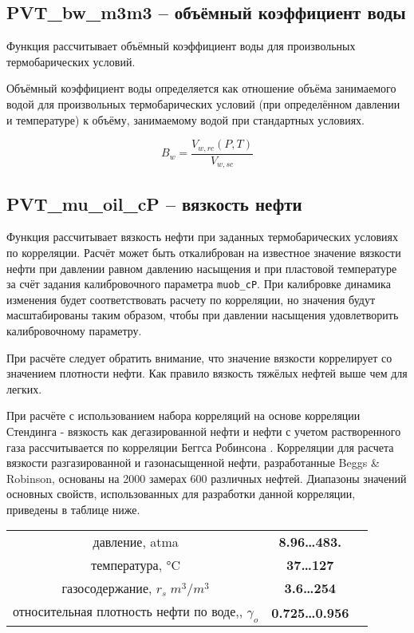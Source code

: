 \subsection{PVT\_bw\_m3m3 – объёмный коэффициент воды}
Функция рассчитывает объёмный коэффициент воды для произвольных термобарических условий. 

Объёмный коэффициент воды определяется как отношение объёма занимаемого водой для произвольных термобарических условий (при определённом давлении и температуре) к объёму, занимаемому водой при стандартных условиях. 

$$B_w = \frac{V_{w,rc}(P,T)}{V_{w,sc}}$$


\subsection{PVT\_mu\_oil\_cP – вязкость нефти}
Функция рассчитывает вязкость нефти при заданных термобарических условиях по корреляции. Расчёт может быть откалиброван на известное значение вязкости нефти при давлении равном давлению насыщения и при пластовой температуре за счёт задания калибровочного параметра \texttt{muob_cP}. При калибровке динамика изменения будет соответствовать расчету по корреляции, но значения будут масштабированы таким образом, чтобы при давлении насыщения удовлетворить калибровочному параметру.

При расчёте следует обратить внимание, что значение вязкости коррелирует со значением плотности нефти. Как правило вязкость тяжёлых нефтей выше чем для легких.

При расчёте с использованием набора корреляций на основе корреляции Стендинга - вязкость как дегазированной нефти и нефти с учетом растворенного газа рассчитывается по корреляции Беггса Робинсона \cite{Yukos_PVT_2002}. 
Корреляции для расчета вязкости разгазированной и газонасыщенной нефти, разработанные Beggs \& Robinson, основаны на 2000 замерах 600 различных нефтей.
Диапазоны значений основных свойств, использованных для разработки данной корреляции, приведены в таблице ниже.
\begin{center}
	\begin{tabular}{ccc}
		давление, atma & \textbf{8.96…483.} \\
		температура, °C & \textbf{37…127}  \\
		газосодержание, $r_s \; m^3 /m^3$ & \textbf{3.6…254}\\
		относительная плотность нефти по воде,, $\gamma_o$ & \textbf{0.725…0.956} \\
	\end{tabular}
\end{center}
   
